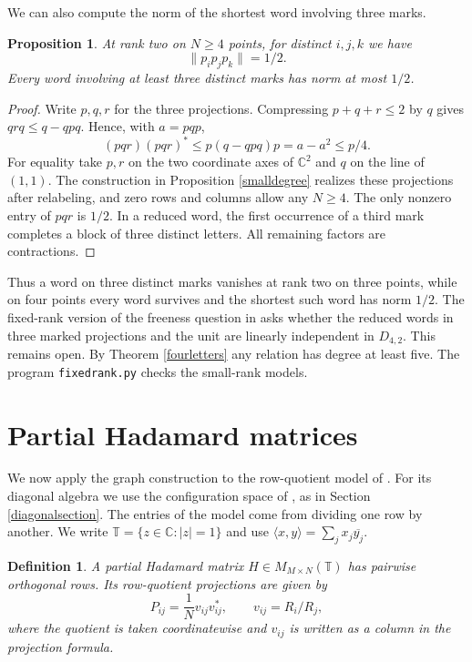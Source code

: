 \documentclass[11pt,a4paper]{article}
\newtheorem{prop}[thm]{Proposition}
\newtheorem{defn}[thm]{Definition}
\begin{document}
We can also compute the norm of the shortest word involving three marks.

\begin{prop}\label{threemarknorm}
At rank two on $N\geq4$ points, for distinct $i,j,k$ we have
\[
 \|p_i p_j p_k\|=1/2.
\]
Every word involving at least three distinct marks has norm at most $1/2$.
\end{prop}
\begin{proof}
Write $p,q,r$ for the three projections. Compressing $p+q+r\leq 2$ by $q$ gives $qrq\leq q-qpq$. Hence, with $a=pqp$,
\[
 (pqr)(pqr)^*\leq p(q-qpq)p=a-a^2\leq p/4 .
\]
For equality take $p,r$ on the two coordinate axes of $\mathbb C^2$ and $q$ on the line of $(1,1)$. The construction in Proposition \ref{smalldegree} realizes these projections after relabeling, and zero rows and columns allow any $N\geq4$. The only nonzero entry of $pqr$ is $1/2$. In a reduced word, the first occurrence of a third mark completes a block of three distinct letters. All remaining factors are contractions.
\end{proof}

Thus a word on three distinct marks vanishes at rank two on three points, while on four points every word survives and the shortest such word has norm $1/2$. The fixed-rank version of the freeness question in \cite{qp} asks whether the reduced words in three marked projections and the unit are linearly independent in $D_{4,2}$. This remains open. By Theorem \ref{fourletters} any relation has degree at least five. The program \texttt{fixedrank.py} checks the small-rank models.

\section{Partial Hadamard matrices}\label{hadamard}

We now apply the graph construction to the row-quotient model of \cite{bs}. For its diagonal algebra we use the configuration space of \cite{qp}, as in Section \ref{diagonalsection}. The entries of the model come from dividing one row by another. We write $\mathbb T=\{z\in\mathbb C:|z|=1\}$ and use $\langle x,y\rangle=\sum_j x_j\overline{y_j}$.

\begin{samepage}
\begin{defn}
A partial Hadamard matrix $H\in M_{M\times N}(\mathbb T)$ has pairwise orthogonal rows. Its row-quotient projections are given by
\[
 P_{ij}=\frac{1}{N}v_{ij}v_{ij}^*,\qquad v_{ij}=R_i/R_j ,
\]
where the quotient is taken coordinatewise and $v_{ij}$ is written as a column in the projection formula.
\end{defn}
\end{samepage}
\end{document}
